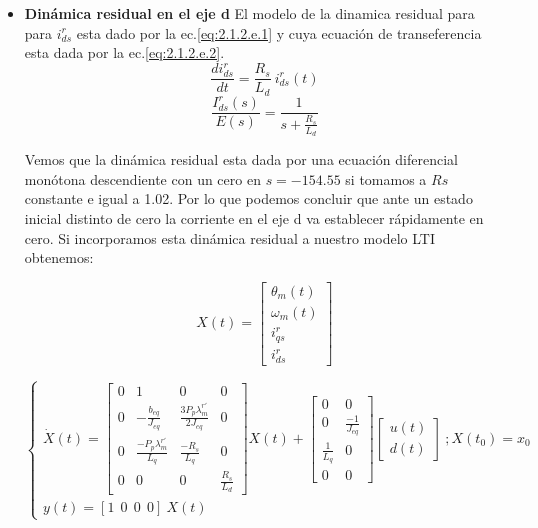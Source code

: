 \documentclass[10pt]{article}
\begin{document}
\begin{enumerate}
\begin{itemize}
	\item\textbf{Dinámica residual en el eje d}
	El modelo de la dinamica residual para para $i^{r}_{ds}$ esta dado por la ec.\ref{eq:2.1.2.e.1} y cuya ecuación de 				transeferencia esta dada por la ec.\ref{eq:2.1.2.e.2}.
	\begin{equation}
	\frac{di^{r}_{ds}}{dt}=\frac{R_{s}}{L_{d}}\ i^{r}_{ds}(t)
	\label{eq:2.1.2.e.1}
	\end{equation}
	\begin{equation}
	\frac{I^{r}_{ds}(s)}{E(s)}=\frac{1}{s+\frac{R_{s}}{L_{d}}}
	\label{eq:2.1.2.e.2}
	\end{equation}
	
	Vemos que la dinámica residual esta dada por una ecuación diferencial monótona descendiente con un cero en $s=-154.55$ si tomamos a $Rs$ constante e igual a 1.02. Por lo que podemos concluir que ante un estado inicial distinto de cero la corriente en el eje d va establecer rápidamente en cero.
	Si incorporamos esta dinámica residual a nuestro modelo LTI obtenemos:
	
	\begin{equation}
	X(t)=\begin{bmatrix}
	\theta_{m}(t)\\
	\omega_{m}(t) 
	\\ 
	i^{r}_{qs}
	\\
	i^{r}_{ds}
	\end{bmatrix}
	\label{eq:2.1.2.e.3}
	\end{equation}
	
	\begin{equation}
	\begin{cases}
	\dot{X}(t)=\begin{bmatrix}
	0 & 1 &0 &0 \\ 
	0 & -\frac{b_{eq}}{J_{eq}} & \frac{3 P_{p} \lambda^{r'}_{m}}{2 J_{eq}} & 0 \\ 
	0  & \frac{- P_{p} \lambda^{r'}_{m}}{ L_{q}} & \frac{-R_{s}}{L_{q}}&0\\
	0&0&0&\frac{R_{s}}{L_{d}}
	\end{bmatrix} X(t) + \begin{bmatrix}
	0 &0 \\ 
	0 &\frac{-1}{J_{eq}} \\ 
	 \frac{1}{L_{q}}&0 \\
	 0&0
	\end{bmatrix} \begin{bmatrix}
	u(t)\\
	d(t) 
	
	\end{bmatrix} \ ; X(t_{0})=x_{0}\\ 
	y(t)=[1 \ \ 0 \ \ 0 \ \ 0 ] \ X(t)
	\end{cases}
	\label{eq:2.1.2.e.4}
	\end{equation}
	


\end{itemize}
\end{enumerate}
\end{document}
